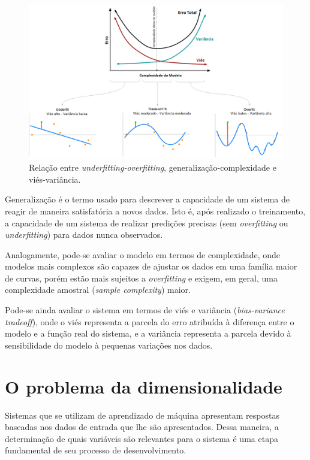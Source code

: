 \begin{figure}[H]
    \caption{Relação entre \textit{underfitting-overfitting}, generalização-complexidade e viés-variância.}
    \begin{center}
    \includegraphics[width=\linewidth]{imgs/intro/over_underfitting}
    \end{center}
    \label{fig:over_underfitting}
\end{figure}

Generalização é o termo usado para descrever a capacidade de um sistema de reagir de maneira satisfatória a novos dados. Isto é, após realizado o treinamento, a capacidade de um sistema de realizar predições precisas (sem \textit{overfitting} ou \textit{underfitting}) para dados nunca observados.

Analogamente, pode-se avaliar o modelo em termos de complexidade, onde modelos mais complexos são capazes de ajustar os dados em uma família maior de curvas, porém estão mais sujeitos a \textit{overfitting} e exigem, em geral, uma complexidade amostral (\textit{sample complexity}) maior.

Pode-se ainda avaliar o sistema em termos de viés e variância (\textit{bias-variance tradeoff}), onde o viés representa a parcela do erro atribuída à diferença entre o modelo e a função real do sistema, e a variância representa a parcela devido à sensibilidade do modelo à pequenas variações nos dados.

\section{O problema da dimensionalidade}

Sistemas que se utilizam de aprendizado de máquina apresentam respostas baseadas nos dados de entrada que lhe são apresentados. Dessa maneira, a determinação de quais variáveis são relevantes para o sistema é uma etapa fundamental de seu processo de desenvolvimento.

